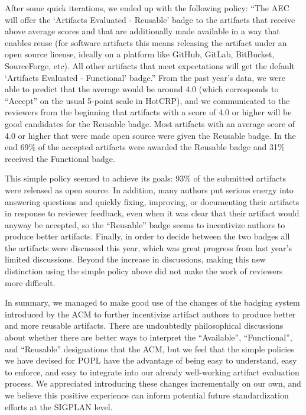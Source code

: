After some quick iterations, we ended up with the following %
policy: “The AEC will offer the ‘Artifacts Evaluated -
Reusable’ badge to the artifacts that receive above average scores and
that are additionally made available in a way that enables reuse (for
software artifacts this means releasing the artifact under an open
source license, ideally on a platform like GitHub, GitLab, BitBucket,
SourceForge, etc). All other artifacts that meet expectations will get
the default ‘Artifacts Evaluated - Functional’ badge.” From the past
year’s data, we were able to predict that the average would be around
4.0 (which corresponds to “Accept” on the usual 5-point scale in
HotCRP), and we communicated to the reviewers from the beginning that
artifacts with a score of 4.0 or higher will be good candidates for
the Reusable badge. %
%
Most artifacts with an average score of 4.0 or higher that were made
open source were given the Reusable badge. In the end 69\% of the
accepted artifacts were awarded the Reusable badge and 31\% received
the Functional badge.

This simple policy seemed to achieve its goals: 93\% of the submitted
artifacts were released as open source. In addition, many authors put
serious energy into answering questions and quickly fixing, improving,
or documenting their artifacts in response to reviewer feedback, even
when it was clear that their artifact would anyway be accepted, so the
“Reusable” badge seems to incentivize authors to produce better
artifacts. Finally, in order to decide between the two badges all the
artifacts were discussed this year, which was great progress from last
year’s limited discussions. Beyond the increase in discussions, making
this new distinction using the simple policy above did not make the
work of reviewers more difficult.


In summary, we managed to make good use of the changes of the badging
system introduced by the ACM to further incentivize artifact authors
to produce better and more reusable artifacts. There are undoubtedly
philosophical discussions about whether there are better ways to
interpret the “Available”, “Functional”, and “Reusable” designations
that the ACM, but we feel that the simple policies we have devised for
POPL have the advantage of being easy to understand, easy to enforce,
and easy to integrate into our already well-working artifact
evaluation process. We appreciated introducing these changes
incrementally on our own, and we believe this positive experience can
inform potential future standardization efforts at the SIGPLAN level.

